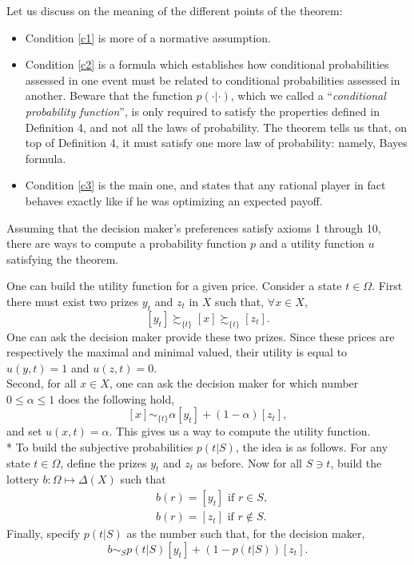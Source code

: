Let us discuss on the meaning of the different points of the theorem:
\begin{itemize}
\item Condition \ref{c1} is more of a normative assumption. 
\item Condition \ref{c2} is a formula which establishes how conditional probabilities assessed in one event must be related to conditional probabilities assessed in another. Beware that the function $p(\cdot|\cdot)$, which we called a ``\emph{conditional probability function}'', is  only required to satisfy the properties defined in Definition 4, and not all the laws of probability.  The theorem tells us that, on top of Definition 4, it must satisfy one more law of probability: namely, Bayes formula.
\item Condition \ref{c3} is the main one, and states that any rational player in fact behaves exactly like if he was optimizing an expected payoff.
\end{itemize}

\begin{example}
Assuming that the decision maker's preferences satisfy axioms 1 through 10, there are ways to compute a probability function $p$ and a utility function $u$ satisfying the theorem.

One can build the utility function for a given price. Consider a state $t \in \Omega$. First there must exist two prizes $y_t$ and $z_t$ in $X$ such that, $\forall x \in X$, 
$$ [y_t]\succsim_{\{t\}} [x] \succsim_{\{t\}} [z_t].$$
One can ask the decision maker provide these two prizes. Since these prices are respectively the maximal and minimal valued, their utility is equal to $u(y,t)=1$ and
$u(z,t)=0$.\\
Second, for all $x \in X$, one can ask the decision maker for which number $0 \leq \alpha \leq 1 $ does the following hold,
$$ [x] \sim_{\{t\}} \alpha[y_t] + (1-\alpha) [z_t],$$
and set $u(x,t) = \alpha.$
This gives us a way to compute the utility function. \\*
To build the subjective probabilities $p(t|S)$, the idea is as follows. For any state $t\in \Omega$, define the prizes $y_t$ and $z_t$ as before. Now for all $S \ni t$, build the lottery $b : \Omega \mapsto \Delta(X)$ such that
$$
\begin{aligned}
& b(r) = [y_t] \text{ if $r \in S$}, \\
& b(r) = [z_t] \text{ if $r \not \in S$}.
\end{aligned} 
$$
Finally, specify $p(t|S)$ as the number such that, for the decision maker,
$$ b \sim_S p(t|S) [y_t] + (1-p(t|S)) [z_t].$$
\end{example}


